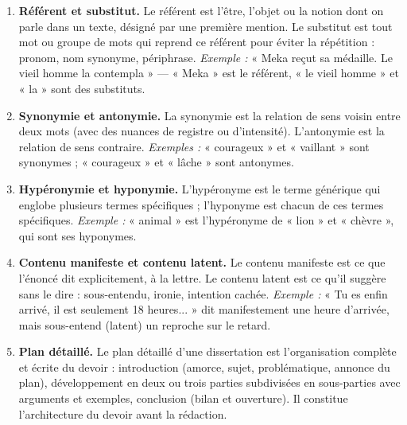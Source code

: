 \documentclass[11pt]{article}
\newcommand{\cle}[1]{{\popxbold\color{popdark}#1}}
\begin{document}
\begin{corrige}

\begin{enumerate}
\item \textbf{Référent et substitut.} Le \cle{référent} est l'être, l'objet ou la notion dont on parle dans un texte, désigné par une première mention. Le \cle{substitut} est tout mot ou groupe de mots qui reprend ce référent pour éviter la répétition : pronom, nom synonyme, périphrase. \emph{Exemple :} « Meka reçut sa médaille. Le vieil homme la contempla » — « Meka » est le référent, « le vieil homme » et « la » sont des substituts.

\item \textbf{Synonymie et antonymie.} La \cle{synonymie} est la relation de sens voisin entre deux mots (avec des nuances de registre ou d'intensité). L'\cle{antonymie} est la relation de sens contraire. \emph{Exemples :} « courageux » et « vaillant » sont synonymes ; « courageux » et « lâche » sont antonymes.

\item \textbf{Hypéronymie et hyponymie.} L'\cle{hypéronyme} est le terme générique qui englobe plusieurs termes spécifiques ; l'\cle{hyponyme} est chacun de ces termes spécifiques. \emph{Exemple :} « animal » est l'hypéronyme de « lion » et « chèvre », qui sont ses hyponymes.

\item \textbf{Contenu manifeste et contenu latent.} Le \cle{contenu manifeste} est ce que l'énoncé dit explicitement, à la lettre. Le \cle{contenu latent} est ce qu'il suggère sans le dire : sous-entendu, ironie, intention cachée. \emph{Exemple :} « Tu es enfin arrivé, il est seulement 18 heures... » dit manifestement une heure d'arrivée, mais sous-entend (latent) un reproche sur le retard.

\item \textbf{Plan détaillé.} Le \cle{plan détaillé} d'une dissertation est l'organisation complète et écrite du devoir : introduction (amorce, sujet, problématique, annonce du plan), développement en deux ou trois parties subdivisées en sous-parties avec arguments et exemples, conclusion (bilan et ouverture). Il constitue l'architecture du devoir avant la rédaction.
\end{enumerate}
\end{corrige}
\end{document}
